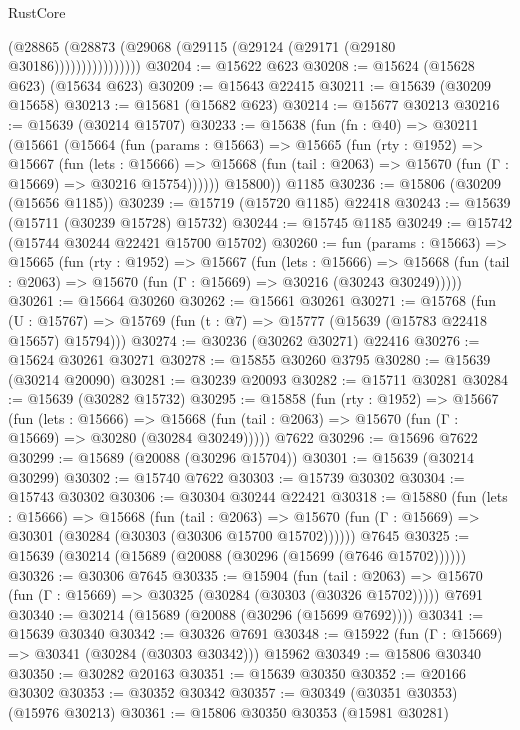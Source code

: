\begin{lexlean}{RustCore}
\begin{coremodule}
                      (@28865 (@28873 (@29068 (@29115 (@29124 (@29171 (@29180 @30186))))))))))))))))
@30204 := @15622 @623
@30208 := @15624 (@15628 @623) (@15634 @623)
@30209 := @15643 @22415
@30211 := @15639 (@30209 @15658)
@30213 := @15681 (@15682 @623)
@30214 := @15677 @30213
@30216 := @15639 (@30214 @15707)
@30233 := @15638
    (fun (fn : @40) =>
    @30211
      (@15661
        (@15664
          (fun (params : @15663) =>
          @15665
            (fun (rty : @1952) =>
            @15667
              (fun (lets : @15666) =>
              @15668 (fun (tail : @2063) => @15670 (fun (Γ : @15669) => @30216 @15754))))))
        @15800))
    @1185
@30236 := @15806 (@30209 (@15656 @1185))
@30239 := @15719 (@15720 @1185) @22418
@30243 := @15639 (@15711 (@30239 @15728) @15732)
@30244 := @15745 @1185
@30249 := @15742 (@15744 @30244 @22421 @15700 @15702)
@30260 := fun (params : @15663) =>
  @15665
    (fun (rty : @1952) =>
    @15667
      (fun (lets : @15666) =>
      @15668 (fun (tail : @2063) => @15670 (fun (Γ : @15669) => @30216 (@30243 @30249)))))
@30261 := @15664 @30260
@30262 := @15661 @30261
@30271 := @15768
    (fun (U : @15767) => @15769 (fun (t : @7) => @15777 (@15639 (@15783 @22418 @15657) @15794)))
@30274 := @30236 (@30262 @30271) @22416
@30276 := @15624 @30261 @30271
@30278 := @15855 @30260 @3795
@30280 := @15639 (@30214 @20090)
@30281 := @30239 @20093
@30282 := @15711 @30281
@30284 := @15639 (@30282 @15732)
@30295 := @15858
    (fun (rty : @1952) =>
    @15667
      (fun (lets : @15666) =>
      @15668 (fun (tail : @2063) => @15670 (fun (Γ : @15669) => @30280 (@30284 @30249)))))
    @7622
@30296 := @15696 @7622
@30299 := @15689 (@20088 (@30296 @15704))
@30301 := @15639 (@30214 @30299)
@30302 := @15740 @7622
@30303 := @15739 @30302
@30304 := @15743 @30302
@30306 := @30304 @30244 @22421
@30318 := @15880
    (fun (lets : @15666) =>
    @15668
      (fun (tail : @2063) =>
      @15670 (fun (Γ : @15669) => @30301 (@30284 (@30303 (@30306 @15700 @15702))))))
    @7645
@30325 := @15639 (@30214 (@15689 (@20088 (@30296 (@15699 (@7646 @15702))))))
@30326 := @30306 @7645
@30335 := @15904
    (fun (tail : @2063) => @15670 (fun (Γ : @15669) => @30325 (@30284 (@30303 (@30326 @15702)))))
    @7691
@30340 := @30214 (@15689 (@20088 (@30296 (@15699 @7692))))
@30341 := @15639 @30340
@30342 := @30326 @7691
@30348 := @15922 (fun (Γ : @15669) => @30341 (@30284 (@30303 @30342))) @15962
@30349 := @15806 @30340
@30350 := @30282 @20163
@30351 := @15639 @30350
@30352 := @20166 @30302
@30353 := @30352 @30342
@30357 := @30349 (@30351 @30353) (@15976 @30213)
@30361 := @15806 @30350 @30353 (@15981 @30281)

\end{coremodule}
\end{lexlean}
